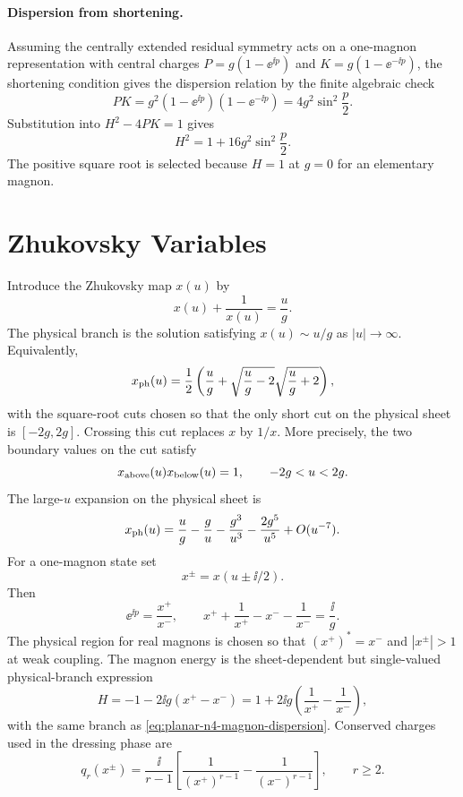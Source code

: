 \paragraph{Dispersion from shortening.}
Assuming the centrally extended residual symmetry acts on a one-magnon
representation with central charges \(P=g(1-\ee^{\ii p})\) and
\(K=g(1-\ee^{-\ii p})\), the shortening condition gives the dispersion
relation by the finite algebraic check
\[
  PK
  =
  g^2(1-\ee^{\ii p})(1-\ee^{-\ii p})
  =
  4g^2\sin^2\frac p2 .
\]
Substitution into \(H^2-4PK=1\) gives
\[
  H^2=1+16g^2\sin^2\frac p2 .
\]
The positive square root is selected because \(H=1\) at \(g=0\) for an
elementary magnon.

\section{Zhukovsky Variables}

Introduce the Zhukovsky map \(x(u)\) by
\begin{equation}
  x(u)+\frac1{x(u)}=\frac ug .
  \label{eq:planar-n4-zhukovsky-map}
\end{equation}
The physical branch is the solution satisfying \(x(u)\sim u/g\) as
\(|u|\to\infty\).  Equivalently,
\[
  x_{\rm ph}(u)
  =
  \frac12\left(
    \frac ug+\sqrt{\frac ug-2}\sqrt{\frac ug+2}
  \right),
\]
with the square-root cuts chosen so that the only short cut on the physical
sheet is \([-2g,2g]\).  Crossing this cut replaces \(x\) by \(1/x\).  More
precisely, the two boundary values on the cut satisfy
\[
  x_{\rm above}(u)x_{\rm below}(u)=1,
  \qquad -2g<u<2g .
\]
The large-\(u\) expansion on the physical sheet is
\[
  x_{\rm ph}(u)
  =
  \frac ug-\frac gu-\frac{g^3}{u^3}
  -\frac{2g^5}{u^5}+O(u^{-7}).
\]
For a one-magnon state set
\[
  x^\pm=x(u\pm\ii/2).
\]
Then
\begin{equation}
  \ee^{\ii p}=\frac{x^+}{x^-},
  \qquad
  x^++\frac1{x^+}-x^- -\frac1{x^-}=\frac{\ii}{g}.
  \label{eq:planar-n4-xpm-definition}
\end{equation}
The physical region for real magnons is chosen so that
\((x^+)^*=x^-\) and \(|x^\pm|>1\) at weak coupling.  The magnon energy is
the sheet-dependent but single-valued physical-branch expression
\begin{equation}
  H
  =
  -1-2\ii g(x^+-x^-)
  =
  1+2\ii g\left(
    \frac1{x^+}-\frac1{x^-}
  \right),
  \label{eq:planar-n4-energy-xpm}
\end{equation}
with the same branch as \eqref{eq:planar-n4-magnon-dispersion}.  Conserved
charges used in the dressing phase are
\[
  q_r(x^\pm)
  =
  \frac{\ii}{r-1}
  \left[
    \frac1{(x^+)^{r-1}}-\frac1{(x^-)^{r-1}}
  \right],
  \qquad r\geq2 .
\]

